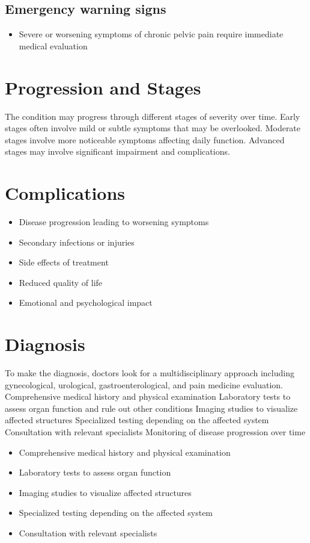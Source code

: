 \subsection{Emergency warning signs}
\begin{itemize}[noitemsep]
  \item Severe or worsening symptoms of chronic pelvic pain require immediate medical evaluation
\end{itemize}
\section{Progression and Stages}
The condition may progress through different stages of severity over time. Early stages often involve mild or subtle symptoms that may be overlooked. Moderate stages involve more noticeable symptoms affecting daily function. Advanced stages may involve significant impairment and complications.
\section{Complications}
\begin{itemize}[noitemsep]
  \item Disease progression leading to worsening symptoms
  \item Secondary infections or injuries
  \item Side effects of treatment
  \item Reduced quality of life
  \item Emotional and psychological impact
\end{itemize}
\section{Diagnosis}
To make the diagnosis, doctors look for a multidisciplinary approach including gynecological, urological, gastroenterological, and pain medicine evaluation. Comprehensive medical history and physical examination Laboratory tests to assess organ function and rule out other conditions Imaging studies to visualize affected structures Specialized testing depending on the affected system Consultation with relevant specialists Monitoring of disease progression over time

\begin{itemize}[noitemsep]
  \item Comprehensive medical history and physical examination
  \item Laboratory tests to assess organ function
  \item Imaging studies to visualize affected structures
  \item Specialized testing depending on the affected system
  \item Consultation with relevant specialists
\end{itemize}
